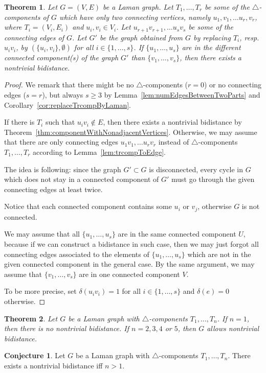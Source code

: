 \documentclass[a4paper, 11pt]{article}
\newcommand{\trcomps}{$\triangle$-components}
\newtheorem{thm}{Theorem}[section]
\theoremstyle{definition}
\newtheorem{conj}{Conjecture}
\begin{document}
\begin{thm}
Let $G=(V,E)$ be a Laman graph. Let  $T_1, \dots, T_r$ be some of the \trcomps{} of $G$ which have only two connecting vertices, namely $u_1, v_1, \dots u_r,v_r$, where  $T_i=(V_i,E_i)$ and $u_i, v_i\in V_i$. Let  $u_{r+1}v_{r+1}, \dots u_s v_s$ be some of the connecting edges of $G$. Let $G'$ be the graph obtained from $G$ by replacing $T_i$, resp. $u_iv_i$, by $(\{u_i, v_i\}, \emptyset)$ for all $i\in \{1, \dots, s\}$.
If $\{u_1, \dots, u_s\}$ are in the different connected component(s) of the graph $G'$ than $\{v_1, \dots, v_s\}$, then there exists a nontrivial bidistance.
\end{thm}
\begin{proof}
We remark that there might be no \trcomps{} ($r=0$) or no connecting edges ($s=r$), but always $s\geq 3$ by Lemma~\ref{lem:numEdgesBetweenTwoParts} and Corollary~\ref{cor:replaceTrcompByLaman}.

If there is $T_i$ such that $u_i v_i \notin E$, then there exists a nontrivial bidistance by Theorem~\ref{thm:componentWithNonadjacentVertices}.
Otherwise, we may assume that there are only connecting edges  $u_1 v_1, \dots u_r v_r$ instead of \trcomps{} $T_1, \dots, T_r$ according to Lemma~\ref{lem:trcompToEdge}.

The idea is following: since the graph $G'\subset G$ is disconnected, every cycle in $G$ which does not stay in a connected component of $G'$ must go through the given  connecting edges at least twice.

Notice that each connected component contains some $u_i$ or $v_j$, otherwise $G$ is not connected. 

We may assume that all $\{u_1, \dots, u_s\}$ are in the same connected component $U$, because if we can construct a bidistance in such case, then we may just forgot all connecting edges associated to the elements of $\{u_1, \dots, u_s\}$ which are not in the given connected component in the general case. By the same argument, we may assume that $\{v_1, \dots, v_s\}$ are in one connected component $V$.

To be more precise, set $\delta(u_i v_i)=1$ for all $i\in \{1, \dots, s\}$ and $\delta(e)=0$ otherwise. 
\end{proof}

\begin{thm}
Let $G$ be a Laman graph with \trcomps{} $T_1,\dots, T_n$. If $n=1$, then there is no nontrivial bidistance. If $n=2,3,4$ or $5$, then $G$ allows nontrivial bidistance.
\end{thm}

\begin{conj}
Let $G$ be a Laman graph with \trcomps{} $T_1,\dots, T_n$. There exists a nontrivial bidistance iff $n>1$.
\end{conj}
\end{document}
